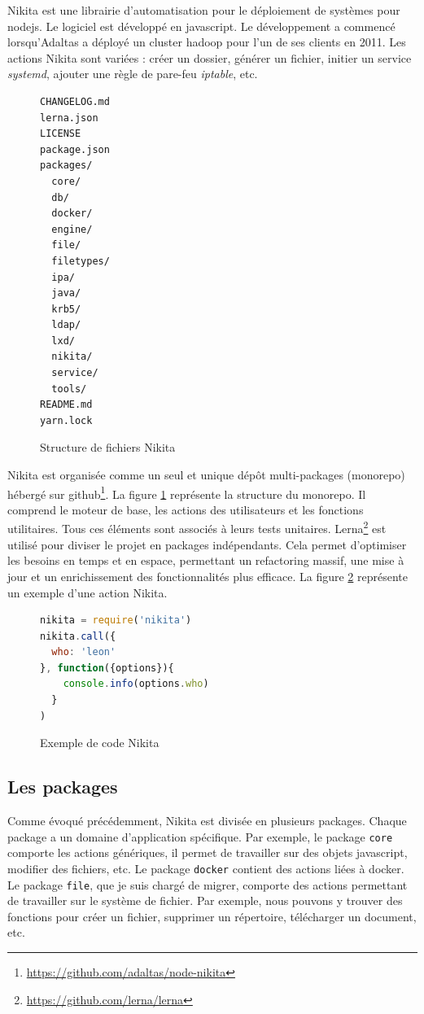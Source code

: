 \documentclass[12pt, french]{report}
\begin{document}
Nikita est une librairie d’automatisation pour le déploiement de systèmes pour \gls{nodejs}. Le logiciel est développé en \gls{javascript}. Le développement a commencé lorsqu'Adaltas a déployé un cluster \gls{hadoop} pour l’un de ses clients en 2011. Les actions Nikita sont variées : créer un dossier, générer un fichier, initier un service \textit{systemd}, ajouter une règle de pare-feu \textit{iptable}, etc.

\begin{figure}[h]
\begin{verbatim}
CHANGELOG.md
lerna.json
LICENSE
package.json
packages/
  core/
  db/
  docker/
  engine/
  file/
  filetypes/
  ipa/
  java/
  krb5/
  ldap/
  lxd/
  nikita/
  service/
  tools/
README.md
yarn.lock
\end{verbatim}
\centering
\caption{Structure de fichiers Nikita}
\label{fig:nikitaFileStructure}
\end{figure}

Nikita est organisée comme un seul et unique dépôt multi-packages (monorepo) hébergé sur \gls{github}\footnote{\href{https://github.com/adaltas/node-nikita}{https://github.com/adaltas/node-nikita}}. La figure \ref{fig:nikitaFileStructure} représente la structure du monorepo. Il comprend le moteur de base, les actions des utilisateurs et les fonctions utilitaires. Tous ces éléments sont associés à leurs tests unitaires. Lerna\footnote{\href{https://github.com/lerna/lerna}{https://github.com/lerna/lerna}} est utilisé pour diviser le projet en packages indépendants. Cela permet d'optimiser les besoins en temps et en espace, permettant un refactoring massif, une mise à jour et un enrichissement des fonctionnalités plus efficace. La figure \ref{code:example} représente un exemple d'une action Nikita.

\begin{figure}[H]
\begin{lstlisting}[language=JavaScript]
nikita = require('nikita')
nikita.call({
  who: 'leon'
}, function({options}){
    console.info(options.who)
  }
)
\end{lstlisting}
\centering
\caption{Exemple de code Nikita}
\label{code:example}
\end{figure}

\subsection{Les packages}

Comme évoqué précédemment, Nikita est divisée en plusieurs packages. Chaque package a un domaine d'application spécifique. Par exemple, le package \texttt{core} comporte les actions génériques, il permet de travailler sur des objets \gls{javascript}, modifier des fichiers, etc. Le package \texttt{docker} contient des actions liées à \gls{docker}. Le package \texttt{file}, que je suis chargé de migrer, comporte des actions permettant de travailler sur le système de fichier. Par exemple, nous pouvons y trouver des fonctions pour créer un fichier, supprimer un répertoire, télécharger un document, etc.
\end{document}
